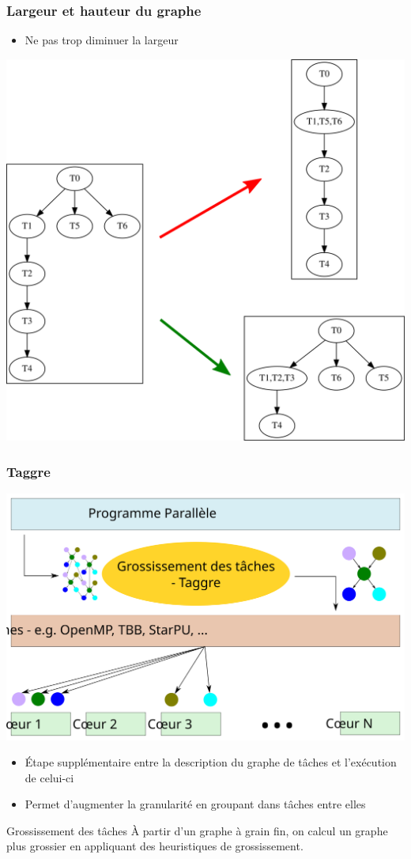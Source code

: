 \documentclass{beamer}
\begin{document}
\begin{frame}
  \frametitle{Largeur et hauteur du graphe}

  \begin{itemize}
    \item Ne pas trop diminuer la largeur
  \end{itemize}

  \centerline{\includegraphics[width=0.6\linewidth]{agg_hl}}
\end{frame}


\begin{frame}
  \frametitle{Taggre}

  \centerline{\includegraphics[width=0.55\linewidth]{coarsening}}

  \begin{itemize}
    \item \'Etape supplémentaire entre la description du graphe de tâches et l'exécution de celui-ci
    \item Permet d'augmenter la granularité en groupant dans tâches entre elles
  \end{itemize}

  \begin{block}{Grossissement des tâches}
    \`A partir d'un graphe à grain fin, on calcul un graphe plus grossier en appliquant
    des heuristiques de grossissement.
  \end{block}
\end{frame}
\end{document}

